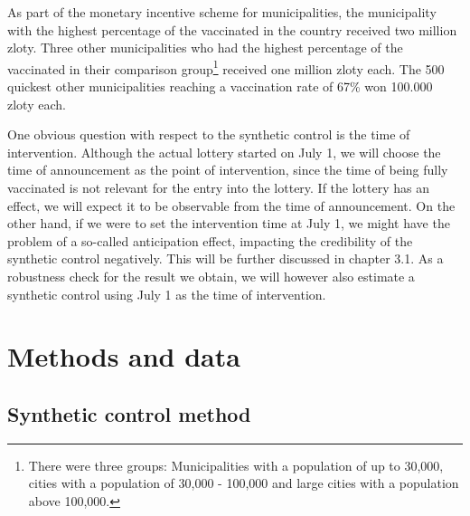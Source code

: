 \documentclass{scrbook}
\begin{document}
As part of the monetary incentive scheme for municipalities, the
municipality with the highest percentage of the vaccinated in the
country received two million zloty. Three other municipalities who had
the highest percentage of the vaccinated in their comparison
group\footnote{There were three groups: Municipalities with a population of up to 30,000, cities with a population of 30,000 - 100,000 and large cities with a population above 100,000.}
received one million zloty each. The 500 quickest other municipalities
reaching a vaccination rate of 67\% won 100.000 zloty each.

One obvious question with respect to the synthetic control is the time
of intervention. Although the actual lottery started on July 1, we will
choose the time of announcement as the point of intervention, since the
time of being fully vaccinated is not relevant for the entry into the
lottery. If the lottery has an effect, we will expect it to be
observable from the time of announcement. On the other hand, if we were
to set the intervention time at July 1, we might have the problem of a
so-called anticipation effect, impacting the credibility of the
synthetic control negatively. This will be further discussed in chapter
3.1. As a robustness check for the result we obtain, we will however
also estimate a synthetic control using July 1 as the time of
intervention.

\chapter{Methods and data}

\section{Synthetic control method}
\end{document}
